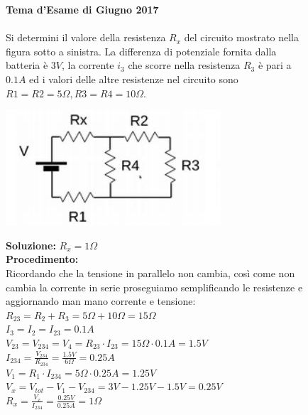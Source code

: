 \begin{figure}[h!]
\textbf{Tema d'Esame di Giugno 2017}\\ \\
 Si determini il valore della resistenza $R_x$ del circuito mostrato nella figura sotto a sinistra. La differenza di potenziale fornita dalla batteria è $3 V$, la corrente $i_3$ che scorre nella resistenza $R_3$ è pari a $0.1 A$ ed i valori delle altre resistenze nel circuito
sono $R1 = R2 = 5 \Omega ,R3 = R4 = 10 \Omega$.
	\begin{center}
		\includegraphics[scale=1.1]{ES5/GIU052017.jpg}
	\end{center}
	\begin{boxed}
		\null\hfill \textbf{Soluzione:} $R_x = 1\Omega$\\
		\textbf{Procedimento: } \\
		Ricordando che la tensione in parallelo non cambia, così come non cambia la corrente in serie proseguiamo semplificando le resistenze e aggiornando man mano corrente e tensione:\\
		$R_{23}=R_2 + R_3=5\Omega + 10\Omega=15\Omega$\\
		$I_3=I_2=I_{23}=0.1A$\\
		$V_{23}=V_{234}=V_4=R_{23} \cdot I_{23}=15\Omega \cdot 0.1A=1.5V$\\
		$I_234=\frac{V_{234}}{R_{234}}=\frac{1.5V}{6\Omega}=0.25A$\\
		$V_1=R_1\cdot I_{234}=5\Omega \cdot 0.25A=1.25V$\\
		$V_x=V_{tot}- V_1 - V_{234}=3V - 1.25V -1.5V=0.25V$\\
		$R_x=\frac{V_x}{I_{234}}=\frac{0.25V}{0.25A}=1\Omega$
		\end{boxed}
\end{figure}

